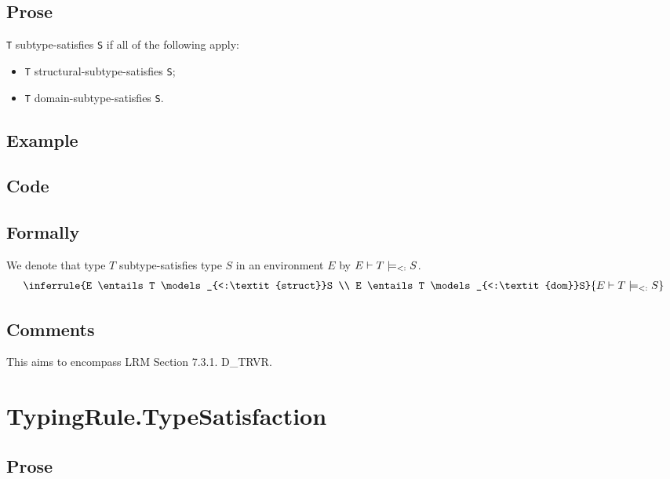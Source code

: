 \documentclass{book}
\newcommand\structsubtypesat[0]{\models_{<:\textit{struct}}}
\newcommand\domsubtypesat[0]{\models_{<:\textit{dom}}}
\newcommand\subtypesat[0]{\models_{<:}}
\begin{document}
  \subsection{Prose}
    \texttt{T} subtype-satisfies \texttt{S} if all of the following apply:
    \begin{itemize}
    \item \texttt{T} structural-subtype-satisfies \texttt{S};
    \item \texttt{T} domain-subtype-satisfies \texttt{S}.
    \end{itemize} 

  \subsection{Example}

  \subsection{Code}

\begin{emptyformal}
    \subsection{Formally}
We denote that type $T$ subtype-satisfies type $S$ in an environment $E$ by $E \entails T \subtypesat S$.
\[
\begin{array}{c}
\inferrule{E \entails T \structsubtypesat S \\ E \entails T \domsubtypesat S}
{E \entails T \subtypesat S}
\end{array}
\]
\end{emptyformal}

\subsection{Comments}
    This aims to encompass LRM Section 7.3.1. D\_TRVR.

\section{TypingRule.TypeSatisfaction \label{sec:TypingRule.TypeSatisfaction}}

\subsection{Prose}
 
\end{document}
